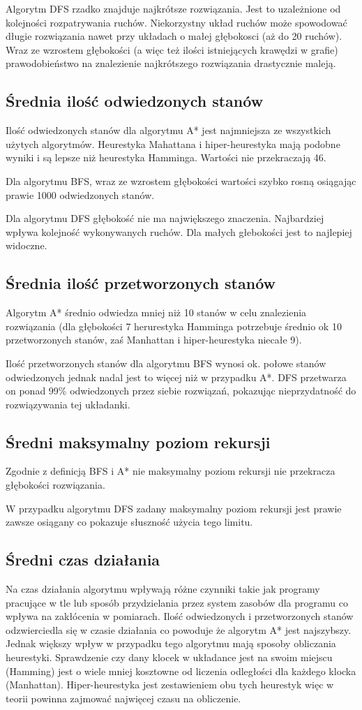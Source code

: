 \documentclass{classrep}
\begin{document}
Algorytm DFS rzadko znajduje najkrótsze rozwiązania. Jest to uzależnione od kolejności rozpatrywania ruchów. Niekorzystny układ ruchów może spowodować długie rozwiązania nawet przy układach o małej głębokosci (aż do 20 ruchów). Wraz ze wzrostem głębokości (a więc też ilości istniejących krawędzi w grafie) prawodobieństwo na znalezienie najkrótszego rozwiązania drastycznie maleją. 
\subsection{Średnia ilość odwiedzonych stanów}
Ilość odwiedzonych stanów dla algorytmu A* jest najmniejsza ze wszystkich użytych algorytmów. Heurestyka Mahattana i hiper-heurestyka mają podobne wyniki i są lepsze niż heurestyka Hamminga. Wartości nie przekraczają 46. 

Dla algorytmu BFS, wraz ze wzrostem głębokości wartości szybko rosną osiągając prawie 1000 odwiedzonych stanów.

Dla algorytmu DFS głębokość nie ma największego znaczenia. Najbardziej wpływa kolejność wykonywanych ruchów. Dla małych głebokości jest to najlepiej widoczne. 
\subsection{Średnia ilość przetworzonych stanów}
Algorytm A* średnio odwiedza mniej niż 10 stanów w celu znalezienia rozwiązania (dla głębokości 7 herurestyka Hamminga potrzebuje średnio ok 10 przetworzonych stanów, zaś Manhattan i hiper-heurestyka niecałe 9).

Ilość przetworzonych stanów dla algorytmu BFS wynosi ok. połowe stanów odwiedzonych jednak nadal jest to więcej niż w przypadku A*.
DFS przetwarza on ponad 99\% odwiedzonych przez siebie rozwiązań, pokazując nieprzydatność do rozwiązywania tej układanki. 
\subsection{Średni maksymalny poziom rekursji}
Zgodnie z definicją BFS i A* nie maksymalny poziom rekursji nie przekracza głębokości rozwiązania.

W przypadku algorytmu DFS zadany maksymalny poziom rekursji jest prawie zawsze osiągany co pokazuje słuszność użycia tego limitu. 
\subsection{Średni czas działania}
Na czas działania algorytmu wpływają różne czynniki takie jak programy pracujące w tle lub sposób przydzielania przez system zasobów dla programu co wpływa na zakłócenia w pomiarach.
Ilość odwiedzonych i przetworzonych stanów odzwierciedla się w czasie działania co powoduje że algorytm A* jest najszybszy. 
Jednak większy wpływ w przypadku tego algorytmu mają sposoby obliczania heurestyki. Sprawdzenie czy dany klocek w układance jest na swoim miejscu (Hamming) jest o wiele mniej kosztowne od liczenia odległości dla każdego klocka (Manhattan). Hiper-heurestyka jest zestawieniem obu tych heurestyk więc w teorii powinna zajmować najwięcej czasu na obliczenie. 
 
\end{document}
